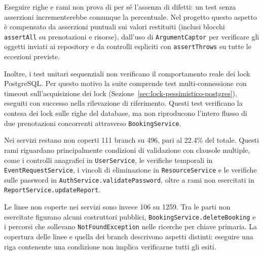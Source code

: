 Eseguire righe e rami non prova di per sé l'assenza di difetti: un test senza asserzioni incrementerebbe comunque la percentuale. Nel progetto questo aspetto è compensato da asserzioni puntuali sui valori restituiti (inclusi blocchi \texttt{assertAll} su prenotazioni e risorse), dall'uso di \texttt{ArgumentCaptor} per verificare gli oggetti inviati ai repository e da controlli espliciti con \texttt{assertThrows} su tutte le eccezioni previste.

Inoltre, i test unitari sequenziali non verificano
il comportamento reale dei lock PostgreSQL.
Per questo motivo la suite comprende test multi-connessione
con timeout sull'acquisizione dei lock
(Sezione~\ref{sec:lock-pessimistico-postgres}),
eseguiti con successo nella rilevazione di riferimento.
Questi test verificano la contesa dei lock sulle righe
del database, ma non riproducono l'intero flusso
di due prenotazioni concorrenti attraverso
\texttt{BookingService}.

Nei servizi restano non coperti 111 branch su 496,
pari al 22.4\% del totale.
Questi rami riguardano principalmente condizioni di validazione
con clausole multiple, come i controlli anagrafici in
\texttt{UserService}, le verifiche temporali in
\texttt{EventRequestService}, i vincoli di eliminazione in
\texttt{ResourceService} e le verifiche sulle password in
\texttt{AuthService.validatePassword}, oltre a rami non esercitati
in \texttt{ReportService.updateReport}.

Le linee non coperte nei servizi sono invece 106 su 1259.
Tra le parti non esercitate figurano alcuni costruttori pubblici,
\texttt{BookingService.deleteBooking} e i percorsi che sollevano
\texttt{NotFoundException} nelle ricerche per chiave primaria.
La copertura delle linee e quella dei branch descrivono aspetti
distinti: eseguire una riga contenente una condizione
non implica verificarne tutti gli esiti.